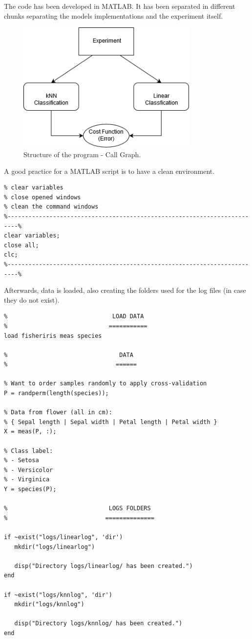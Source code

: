 \documentclass[11pt]{article}
\begin{document}
The code has been developed in MATLAB. It has been separated in different
chunks separating the models implementations and the experiment itself.

\begin{figure}[h]
 \centering
 \includegraphics[width=0.8\textwidth]{../diagrams/call_tree.png}
 \caption{Structure of the program - Call Graph.}
\end{figure}

A good practice for a MATLAB script is to have a clean environment.

\begin{verbatim}
% clear variables
% close opened windows
% clean the command windows
%-------------------------------------------------------------------------%
clear variables;
close all;
clc;
%-------------------------------------------------------------------------%
\end{verbatim}

Afterwards, data is loaded, also creating the folders used for the log files (in
case they do not exist).

\begin{verbatim}
%                              LOAD DATA
%                             ===========
load fisheriris meas species

%                                DATA 
%                               ======

% Want to order samples randomly to apply cross-validation
P = randperm(length(species));

% Data from flower (all in cm):
% { Sepal length | Sepal width | Petal length | Petal width }
X = meas(P, :);

% Class label:
% - Setosa
% - Versicolor
% - Virginica
Y = species(P);

%                             LOGS FOLDERS
%                            ==============

if ~exist("logs/linearlog", 'dir')
   mkdir("logs/linearlog")
   
   disp("Directory logs/linearlog/ has been created.")
end

if ~exist("logs/knnlog", 'dir') 
   mkdir("logs/knnlog")
   
   disp("Directory logs/knnlog/ has been created.")
end
\end{verbatim}
\end{document}
